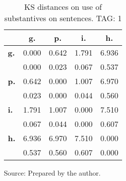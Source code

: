 \begin{table}[h!]
\begin{center}
\caption{KS distances on use of substantives on sentences. TAG: 1}
	\label{tab:kolSub}
\begin{tabular}{| l || c | c | c | c |}\hline
 & {\bf g.} & {\bf p.} & {\bf i.} & {\bf h.} \\\hline\hline
{\bf g.} & 0.000 & 0.642 & 1.791 & 6.936 \\
{\bf } & 0.000 & 0.023 & 0.067 & 0.537 \\\hline
{\bf p.} & 0.642 & 0.000 & 1.007 & 6.970 \\
{\bf } & 0.023 & 0.000 & 0.044 & 0.560 \\\hline
{\bf i.} & 1.791 & 1.007 & 0.000 & 7.510 \\
{\bf } & 0.067 & 0.044 & 0.000 & 0.607 \\\hline
{\bf h.} & 6.936 & 6.970 & 7.510 & 0.000 \\
{\bf } & 0.537 & 0.560 & 0.607 & 0.000 \\\hline
\end{tabular}
\end{center}
\begin{flushleft}
		Source: Prepared by the author.\
\end{flushleft}
\end{table}
